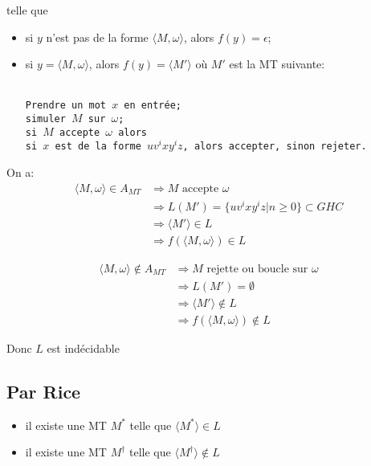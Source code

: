 \documentclass{article}
\newcommand\bk[1]{\langle #1 \rangle}
\newcommand\tab{\hspace{2cm}}
\begin{document}
telle que

\begin{itemize}
\item si $y$ n'est pas de la forme $\bk{M, \omega}$, alors $f(y)=\epsilon$;
\item si $y=\bk{M, \omega}$, alors $f(y)=\bk{M'}$ où $M'$ est la MT suivante:

  \hspace{2cm}
  \begin{minipage}{12cm}
    \texttt{
      \\
      Prendre un mot $x$ en entrée;\\
      simuler $M$ sur $\omega$;\\
      si $M$ accepte $\omega$ alors\\
      \tab{} si $x$ est de la forme $uv^ixy^iz$, alors accepter, sinon rejeter.
      }
  \end{minipage}
\end{itemize}

On a:
\begin{align*}
  \bk{M, \omega} \in A_{MT} &\Rightarrow M \text{ accepte } \omega\\
  &\Rightarrow L(M') = \{uv^ixy^iz | n \geq 0\} \subset GHC\\
  &\Rightarrow \bk{M'} \in L\\
  &\Rightarrow f(\bk{M, \omega}) \in L
\end{align*}

\begin{align*}
  \bk{M, \omega} \notin A_{MT} &\Rightarrow M \text{ rejette ou boucle sur } \omega\\
  &\Rightarrow L(M') = \emptyset\\
  &\Rightarrow \bk{M'} \notin L\\
  &\Rightarrow f(\bk{M, \omega}) \notin L
\end{align*}

Donc $L$ est indécidable
\subsection{Par Rice}
\begin{itemize}
\item il existe une MT $M^*$ telle que $\bk{M^*} \in L$
\item il existe une MT $M^\dag$ telle que $\bk{M^\dag} \notin L$
\end{itemize}

\vspace{1cm}
\end{document}

